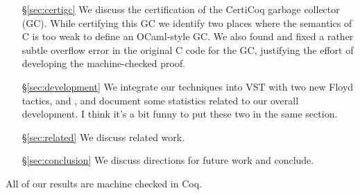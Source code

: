 \begin{itemize}
\item[\S\ref{sec:certigc}] We discuss the certification of the CertiCoq garbage collector (GC). While certifying this GC we identify two places where the semantics of C is too weak to define an OCaml-style GC. We also found and fixed a rather subtle overflow error in the original C code for the GC, justifying the effort of developing the machine-checked proof.
\item[\S\ref{sec:development}] We integrate our techniques into VST with two new Floyd tactics,  and , and document some statistics related to our overall development. {\color{blue} I think it's a bit funny to put these two in the same section.}
\item[\S\ref{sec:related}] We discuss related work.
\item[\S\ref{sec:conclusion}] We discuss directions for future work and conclude.
\end{itemize}
All of our results are machine checked in Coq.

